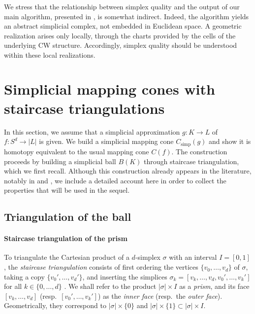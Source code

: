 \documentclass[a4paper,english,cleveref,autoref,thm-restate,nolineno]{socg-lipics-v2021}
\newcommand{\geomreal}[1] { |#1| } %
\newcommand{\conesimp}[1] { C_\mathrm{simp}(#1) } %
\newcommand{\cone}[1] { C(#1) } %
\begin{document}
{	We stress that the relationship between simplex quality and the output of our main algorithm, presented in , is somewhat indirect. 
	Indeed, the algorithm yields an abstract simplicial complex, not embedded in Euclidean space.
	A geometric realization arises only locally, through the charts provided by the cells of the underlying CW structure. 
	Accordingly, simplex quality should be understood within these local realizations.
}

\section{Simplicial mapping cones with staircase triangulations}
\label{sec:simplicial_mapping_cones}

In this section, we assume that a simplicial approximation $g\colon K\to L$ of $f\colon S^{d}\to\geomreal{L}$ is given.
We build a simplicial mapping cone $\conesimp{g}$ and show it is homotopy equivalent to the usual mapping cone $\cone{f}$.
The construction proceeds by building a simplicial ball $B(K)$ through staircase triangulation, which we first recall.
Although this construction already appears in the literature, notably in \cite[Exercise~E, p.~151]{Spanier_1981} and \cite[Proposition~2]{Bell_2004}, we include a detailed account here in order to collect the properties that will be used in the sequel.

\subsection{Triangulation of the ball}\label{subsec:triangulation_ball}

\paragraph*{Staircase triangulation of the prism}

To triangulate the Cartesian product of a $d$-simplex $\sigma$ with an interval $I = [0,1]$, the \textit{staircase triangulation} consists of first ordering the vertices $\{v_0,\dots,v_d\}$ of $\sigma$, taking a copy $\{v_0',\dots,v_d'\}$, and inserting the simplices $\sigma_k = [v_k,\dots,v_d,v_0',\dots,v_k']$ for all $k\in \{ 0,\dots,d \}$ \cite{lee2017subdivisions}.
We shall refer to the product $\geomreal{\sigma}\times I$ as a \emph{prism}, and its face $[v_k,\dots,v_d]$ (resp.\ $[v_0',\dots,v_k']$) as the \emph{inner face} (resp.\ the \emph{outer face}). 
Geometrically, they correspond to $\geomreal{\sigma}\times\{0\}$ and $\geomreal{\sigma}\times\{1\}\subset\geomreal{\sigma}\times I$.
\end{document}
